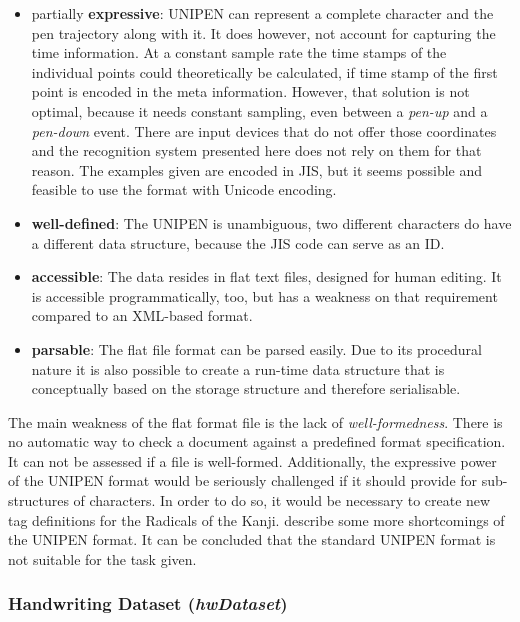 \begin{itemize}
  \item partially \textbf{expressive}: UNIPEN can represent a complete character
        and the pen trajectory along with it. It does however, not account for
        capturing the time information. At a constant sample rate the time stamps
        of the individual points could theoretically be calculated, 
        if time stamp of the first point is encoded in the meta information. 
        However, that solution is not optimal, because it needs constant
        sampling, even between a \emph{pen-up} and a \emph{pen-down} event.
        There are input devices that do not offer those coordinates and the 
        recognition system presented here does not rely on them for that reason.
        The examples given are encoded in JIS, but it seems possible and feasible
        to use the format with Unicode encoding.

  \item \textbf{well-defined}: The UNIPEN is unambiguous, two different 
        characters do have a different data structure, because the JIS code 
        can serve as an ID.

  \item \textbf{accessible}: The data resides in flat text files, designed for 
        human editing. It is accessible programmatically, too, but has a weakness
        on that requirement compared to an XML-based format.

  \item \textbf{parsable}: The flat file format can be parsed easily. Due to its
        procedural nature it is also possible to create a run-time data structure
        that is conceptually based on the storage structure and therefore
        serialisable.
\end{itemize}
The main weakness of the flat format file is the lack of \emph{well-formedness}.
There is no automatic way to check a document against a predefined format 
specification. It can not be assessed if a file is well-formed.
Additionally, the expressive power of the UNIPEN format would be seriously 
challenged if it should provide for sub-structures of characters.
In order to do so, it would be necessary to create new tag definitions for the 
Radicals of the Kanji.  \citeyear{Agrawal2005} 
describe some more shortcomings of the UNIPEN format. It can be concluded that 
the standard UNIPEN format is not suitable for the task given. 

\subsubsection{Handwriting Dataset (\emph{hwDataset})}
\label{sec:hwre:hwdataset}

